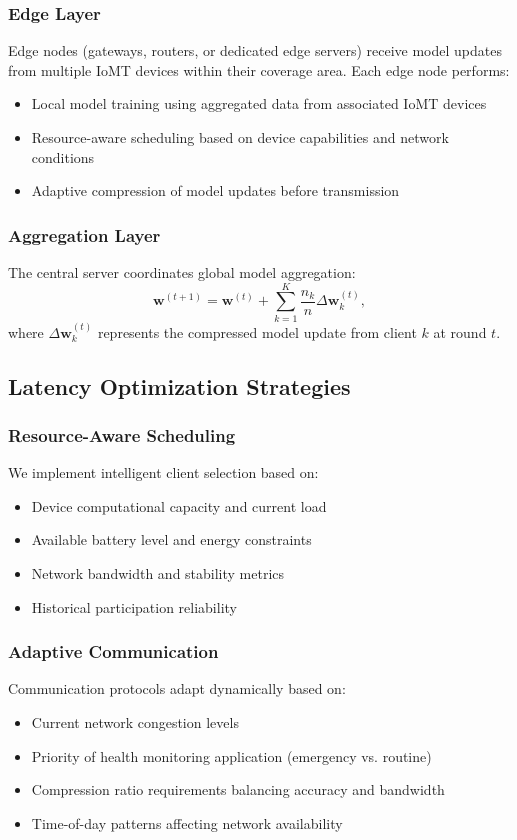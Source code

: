 \documentclass[10pt,conference]{IEEEtran}
\begin{document}
\subsubsection{Edge Layer}
Edge nodes (gateways, routers, or dedicated edge servers) receive model updates from multiple IoMT devices within their coverage area. Each edge node performs:
\begin{itemize}
    \item Local model training using aggregated data from associated IoMT devices
    \item Resource-aware scheduling based on device capabilities and network conditions
    \item Adaptive compression of model updates before transmission
\end{itemize}

\subsubsection{Aggregation Layer}
The central server coordinates global model aggregation:
\begin{equation}
\mathbf{w}^{(t+1)} = \mathbf{w}^{(t)} + \sum_{k=1}^K \frac{n_k}{n} \Delta \mathbf{w}_k^{(t)},
\end{equation}
where $\Delta \mathbf{w}_k^{(t)}$ represents the compressed model update from client $k$ at round $t$.

\subsection{Latency Optimization Strategies}

\subsubsection{Resource-Aware Scheduling}
We implement intelligent client selection based on:
\begin{itemize}
    \item Device computational capacity and current load
    \item Available battery level and energy constraints
    \item Network bandwidth and stability metrics
    \item Historical participation reliability
\end{itemize}

\subsubsection{Adaptive Communication}
Communication protocols adapt dynamically based on:
\begin{itemize}
    \item Current network congestion levels
    \item Priority of health monitoring application (emergency vs. routine)
    \item Compression ratio requirements balancing accuracy and bandwidth
    \item Time-of-day patterns affecting network availability
\end{itemize}
\end{document}
